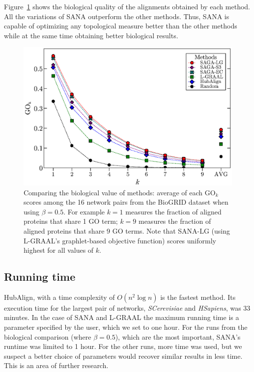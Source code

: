 \documentclass{bioinfo}
\begin{document}
Figure~\ref{fig:biogridgo} shows the biological quality of the alignments obtained by each method. All the variations of SANA outperform the other methods. Thus, SANA is capable of optimizing any topological measure better than the other methods while at the same time obtaining better biological results.

\begin{figure}
\centering
\includegraphics[width=0.99\linewidth]{biogridgo_bw.eps}
\caption{Comparing the biological value of methods: average of each $\mbox{GO}_k$ scores among the 16 network pairs from the BioGRID dataset when using $\beta=0.5$. For example $k=1$ measures the fraction of aligned proteins that share 1 GO term; $k=9$ measures the fraction of aligned proteins that share 9 GO terms. Note that SANA-LG (using L-GRAAL's graphlet-based objective function) scores uniformly highest for all values of $k$.}
\label{fig:biogridgo}
\end{figure}

\subsection{Running time}

HubAlign, with a time complexity of $O(n^2\log n)$ is the fastest method. Its execution time for the largest pair of networks, \textit{SCerevisiae} and \textit{HSapiens}, was 33 minutes. In the case of SANA and L-GRAAL the maximum running time is a parameter specified by the user, which we set to one hour. For the runs from the biological comparison (where $\beta=0.5$), which are the most important, SANA's runtime was limited to 1 hour. For the other runs, more time was used, but we suspect a better choice of parameters would recover similar results in less time. This is an area of further research.
\end{document}
